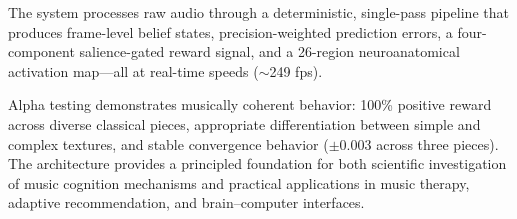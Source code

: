 \documentclass[10pt,twocolumn]{article}
\begin{document}
The system processes raw audio through a deterministic, single-pass pipeline that produces frame-level belief states, precision-weighted prediction errors, a four-component salience-gated reward signal, and a 26-region neuroanatomical activation map---all at real-time speeds ($\sim$249 fps).

Alpha testing demonstrates musically coherent behavior: 100\% positive reward across diverse classical pieces, appropriate differentiation between simple and complex textures, and stable convergence behavior ($\pm$0.003 across three pieces).
The architecture provides a principled foundation for both scientific investigation of music cognition mechanisms and practical applications in music therapy, adaptive recommendation, and brain--computer interfaces.

\end{document}
